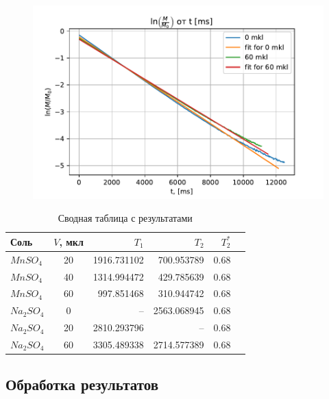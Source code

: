 \begin{figure}[!h]
	\hspace{-5em}
	\includegraphics[width=1.2\linewidth]{data/Na_T_2_reg}
	\caption{}
	\label{fig:nat2reg}
\end{figure}



\begin{table}[ht]
	\caption{Сводная таблица с результатами}
	\label{table:all-T}
	\centering
	\begin{tabular}{|l|c|r|r|r|r|}
		\toprule
		Соль &     $V$, мкл &          $T_1$ &          $T_2$ &  $T_2^*$ \\
		\midrule
		$MnSO_4$  	&  20 &  1916.731102 &   700.953789 &  0.68 \\
		$MnSO_4$  	&  40 &  1314.994472 &   429.785639 &  0.68 \\
		$MnSO_4$ 	&  60 &   997.851468 &   310.944742 &  0.68 \\
		$Na_2 SO_4$ &   0 &          --	 &  2563.068945 &  0.68 \\
		$Na_2 SO_4$ &  20 &  2810.293796 &          --  &  0.68 \\
		$Na_2 SO_4$ &  60 &  3305.489338 &  2714.577389 &  0.68 \\
		\bottomrule
	\end{tabular}
\end{table}

\subsection{Обработка результатов}